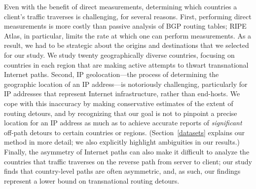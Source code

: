 Even with the benefit of direct measurements, determining which countries a
client's traffic traverses is challenging, for several reasons.  First,
performing direct measurements is more costly than passive analysis of BGP
routing tables; RIPE Atlas, in particular, limits the rate at which one can
perform measurements.  As a result, we had to be strategic about the origins
and destinations that we selected for our study. We study twenty
geographically diverse countries,  focusing on countries in each region that
are making active attempts to thwart transnational Internet paths.  Second, IP
geolocation---the process of determining the geographic location of an IP
address---is notoriously challenging, particularly for IP addresses that
represent Internet infrastructure, rather than end-hosts. We cope with this
inaccuracy by making conservative estimates of the extent of routing detours,
and by recognizing that our goal is not to pinpoint a precise location for an
IP address as much as to achieve accurate reports of {\em significant} off-path 
detours to certain countries or regions. (Section~\ref{datasets} explains
our method in more detail; we also explicitly highlight ambiguities in our
results.) Finally, the asymmetry of Internet paths can also make it difficult
to analyze the countries that traffic traverses on the reverse path from
server to client; our study finds that country-level paths are often
asymmetric, and, as such, our findings represent a lower bound on
transnational routing detours.

